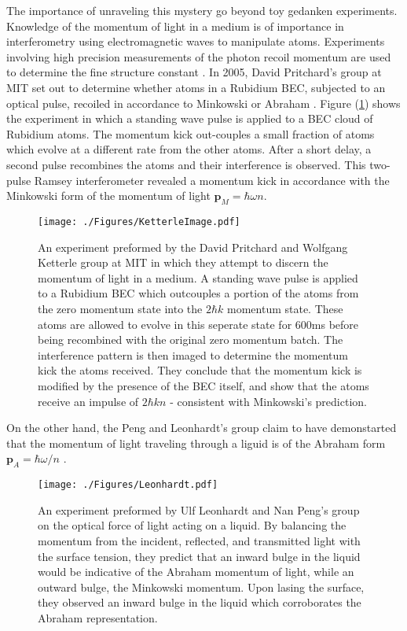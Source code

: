 The importance of unraveling this mystery go beyond toy gedanken experiments. Knowledge of the momentum of light in a medium is of importance in interferometry using electromagnetic waves to manipulate atoms. Experiments involving high precision measurements of the photon recoil momentum are used to determine the fine structure constant \cite{spectroscopy} .  In 2005, David Pritchard's group at MIT set out to determine whether atoms in a Rubidium BEC,  subjected to an optical pulse, recoiled in accordance to Minkowski or Abraham \cite{ketterle}.  Figure (\ref{fig:ketterle}) shows the experiment in which a standing wave pulse is applied to a BEC cloud of Rubidium atoms. The momentum kick out-couples a small fraction of atoms which evolve at a different rate from the other atoms.  After a short delay, a second pulse recombines the atoms and their interference is observed. This two-pulse Ramsey interferometer revealed a momentum kick in accordance with the Minkowski form of the momentum of light $\mathbf{p}_{M}=\hbar\omega n $.  
\begin{figure}[htp]
\texttt{[image: ./Figures/KetterleImage.pdf]}
\caption{An experiment preformed by the David Pritchard and Wolfgang Ketterle group at MIT \cite{ketterle} in which they attempt to discern the momentum of light in a medium.  A standing wave pulse is applied to a Rubidium BEC which outcouples a portion of the atoms from the zero momentum state into the $2\hbar k$ momentum state.  These atoms are allowed to evolve in this seperate state for $600$ms before being recombined with the original zero momentum batch.  The interference pattern is then imaged to determine the momentum kick the atoms received. They conclude that the momentum kick is modified by the presence of the BEC itself, and show that the atoms receive an impulse of $2\hbar k n$ - consistent with Minkowski's prediction.} 
\label{fig:ketterle}
\end{figure}

On the other hand, the Peng and Leonhardt's group claim to have demonstarted that the momentum of light traveling through a liguid is of the Abraham form $\mathbf{p}_{A}=\hbar\omega/n$ \cite{leonhardt2}.
\begin{figure}[htp]
\centering
\texttt{[image: ./Figures/Leonhardt.pdf]}
\caption{An experiment preformed by Ulf Leonhardt and Nan Peng's group \cite{leonhardt2} on the optical force of light acting on a liquid. By balancing the momentum from the incident, reflected, and transmitted light with the surface tension, they predict that an inward bulge in the liquid would be indicative of the Abraham momentum of light, while an outward bulge, the Minkowski momentum. Upon lasing the surface, they observed an inward bulge in the liquid which corroborates the Abraham representation.} 
\label{fig:sphere}
\end{figure}



